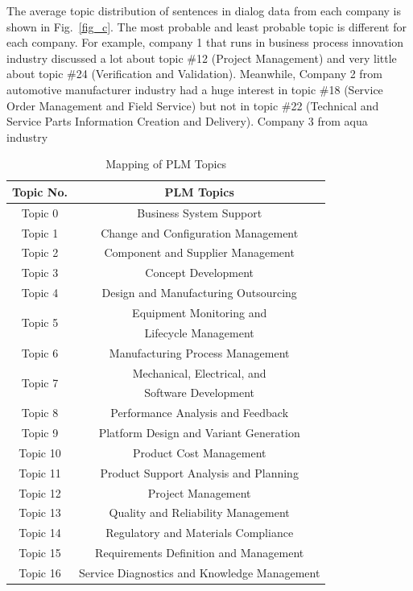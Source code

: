 \documentclass[10pt, conference, compsocconf]{IEEEtran}
\begin{document}
The average topic distribution of sentences in dialog data from each company is shown in Fig.~\ref{fig_c}. The most probable and least probable topic is different for each company. For example, company 1 that runs in business process innovation industry discussed a lot about topic \#12 (Project Management) and very little about topic \#24 (Verification and Validation). Meanwhile, Company 2 from automotive manufacturer industry had a huge interest in topic \#18 (Service Order Management and Field Service) but not in topic \#22 (Technical and Service Parts Information Creation and Delivery). Company 3 from aqua industry \begin{table}[h]
\renewcommand{\arraystretch}{1.3}
\caption{Mapping of PLM Topics}
\label{table 5: mapping plm}
\centering
{\begin{tabular}{|c|c|}
\hline
\textbf{Topic No.}&\textbf{PLM Topics}\\
\hline
Topic 0&Business System Support  \\
\hline
Topic 1&Change and Configuration Management \\
\hline
Topic 2&Component and Supplier Management \\
\hline
Topic 3&Concept Development \\
\hline
Topic 4&Design and Manufacturing Outsourcing \\
\hline
\multirow{2}{*}{Topic 5}&Equipment Monitoring and\\
&Lifecycle Management \\
\hline
Topic 6&Manufacturing Process Management \\
\hline
\multirow{2}{*}{Topic 7}&Mechanical, Electrical, and \\
&Software Development \\
\hline
Topic 8&Performance Analysis and Feedback \\
\hline
Topic 9&Platform Design and Variant Generation \\
\hline
Topic 10&Product Cost Management \\
\hline
Topic 11&Product Support Analysis and Planning \\
\hline
Topic 12&Project Management \\
\hline
Topic 13&Quality and Reliability Management \\
\hline
Topic 14&Regulatory and Materials Compliance \\
\hline
Topic 15&Requirements Definition and Management \\
\hline
Topic 16&Service Diagnostics and Knowledge Management \\

\end{tabular}}
\end{table}
\end{document}
